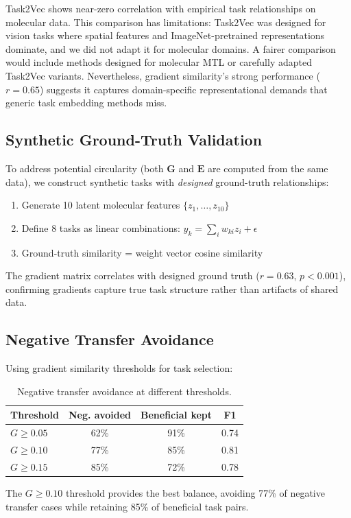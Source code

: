 \documentclass{article}
\newcommand{\G}{\mathbf{G}}
\newcommand{\E}{\mathbf{E}}
\begin{document}
Task2Vec shows near-zero correlation with empirical task relationships on molecular data. This comparison has limitations: Task2Vec was designed for vision tasks where spatial features and ImageNet-pretrained representations dominate, and we did not adapt it for molecular domains. A fairer comparison would include methods designed for molecular MTL or carefully adapted Task2Vec variants. Nevertheless, gradient similarity's strong performance ($r=0.65$) suggests it captures domain-specific representational demands that generic task embedding methods miss.

\subsection{Synthetic Ground-Truth Validation}

To address potential circularity (both $\G$ and $\E$ are computed from the same data), we construct synthetic tasks with \textit{designed} ground-truth relationships:

\begin{enumerate}[nosep,topsep=2pt]
    \item Generate 10 latent molecular features $\{z_1, \ldots, z_{10}\}$
    \item Define 8 tasks as linear combinations: $y_k = \sum_i w_{ki} z_i + \epsilon$
    \item Ground-truth similarity = weight vector cosine similarity
\end{enumerate}

The gradient matrix correlates with designed ground truth ($r = 0.63$, $p < 0.001$), confirming gradients capture true task structure rather than artifacts of shared data.

\subsection{Negative Transfer Avoidance}

Using gradient similarity thresholds for task selection:

\begin{table}[H]
\caption{Negative transfer avoidance at different thresholds.}
\begin{center}
\begin{tabular}{lccc}
\toprule
Threshold & Neg. avoided & Beneficial kept & F1 \\
\midrule
$G \geq 0.05$ & 62\% & 91\% & 0.74 \\
$G \geq 0.10$ & 77\% & 85\% & 0.81 \\
$G \geq 0.15$ & 85\% & 72\% & 0.78 \\
\bottomrule
\end{tabular}
\end{center}
\end{table}

The $G \geq 0.10$ threshold provides the best balance, avoiding 77\% of negative transfer cases while retaining 85\% of beneficial task pairs.
\end{document}
